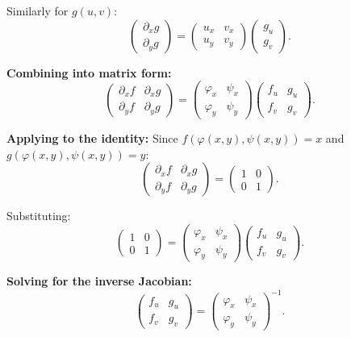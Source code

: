 \documentclass[11pt]{report}
\begin{document}
Similarly for $g(u, v)$:
\[
\begin{pmatrix} \partial_x g \\ \partial_y g \end{pmatrix} = \begin{pmatrix} u_x & v_x \\ u_y & v_y \end{pmatrix} \begin{pmatrix} g_u \\ g_v \end{pmatrix}.
\]

\textbf{Combining into matrix form:}
\[
\begin{pmatrix} \partial_x f & \partial_x g \\ \partial_y f & \partial_y g \end{pmatrix} = \begin{pmatrix} \varphi_x & \psi_x \\ \varphi_y & \psi_y \end{pmatrix} \begin{pmatrix} f_u & g_u \\ f_v & g_v \end{pmatrix}.
\]

\textbf{Applying to the identity:} Since $f(\varphi(x,y), \psi(x,y)) = x$ and $g(\varphi(x,y), \psi(x,y)) = y$:
\[
\begin{pmatrix} \partial_x f & \partial_x g \\ \partial_y f & \partial_y g \end{pmatrix} = \begin{pmatrix} 1 & 0 \\ 0 & 1 \end{pmatrix}.
\]

Substituting:
\[
\begin{pmatrix} 1 & 0 \\ 0 & 1 \end{pmatrix} = \begin{pmatrix} \varphi_x & \psi_x \\ \varphi_y & \psi_y \end{pmatrix} \begin{pmatrix} f_u & g_u \\ f_v & g_v \end{pmatrix}.
\]

\textbf{Solving for the inverse Jacobian:}
\[
\begin{pmatrix} f_u & g_u \\ f_v & g_v \end{pmatrix} = \begin{pmatrix} \varphi_x & \psi_x \\ \varphi_y & \psi_y \end{pmatrix}^{-1}.
\]
\end{document}
